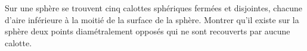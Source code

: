 Sur une sphère se trouvent cinq calottes sphériques fermées et disjointes, chacune d'aire inférieure à la moitié de la surface de la sphère. Montrer qu'il existe sur la sphère deux points diamétralement opposés qui ne sont recouverts par aucune calotte.
